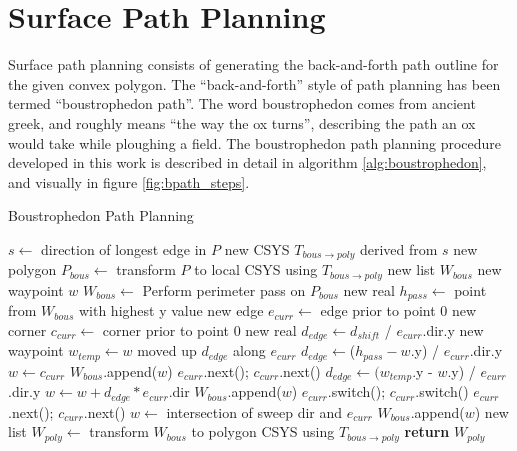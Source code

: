 \section{Surface Path Planning}
Surface path planning consists of generating the back-and-forth path outline for the given convex polygon.
The ``back-and-forth'' style of path planning has been termed ``boustrophedon path''.
The word boustrophedon comes from ancient greek, and roughly means ``the way the ox turns'', describing the path an ox would take while ploughing a field.
The boustrophedon path planning procedure developed in this work is described in detail in algorithm \ref{alg:boustrophedon}, and visually in figure \ref{fig:bpath_steps}.

\begin{algorithm}[htb]
\caption{Boustrophedon Path Planning}\label{alg:boustrophedon}
\begin{algorithmic}[1]
		\State $s \leftarrow$ direction of longest edge in $P$
	\EndIf
	\State new CSYS $T_{bous\rightarrow poly}$ derived from $s$
	\State new polygon $P_{bous} \leftarrow$ transform $P$ to local CSYS using $T_{bous\rightarrow poly}$
	\State new list $W_{bous}$ 
	\State new waypoint $w$
	\State $W_{bous} \leftarrow$ Perform perimeter pass on $P_{bous}$
	\State new real $h_{pass} \leftarrow$ point from $W_{bous}$ with highest y value
	\State new edge $e_{curr} \leftarrow$ edge prior to point 0
	\State new corner $c_{curr} \leftarrow$ corner prior to point 0
		\State new real $d_{edge} \leftarrow d_{shift}$ / $e_{curr}$.dir.y
		\State new waypoint $w_{temp} \leftarrow w$ moved up $d_{edge}$ along $e_{curr}$
			\State $d_{edge} \leftarrow $($h_{pass} - w$.y) / $e_{curr}$.dir.y
			\State $w \leftarrow c_{curr}$
			\State $W_{bous}$.append($w$)
			\State $e_{curr}$.next(); $c_{curr}$.next()
			\State $d_{edge} \leftarrow (w_{temp}$.y - $w$.y) / $e_{curr}$.dir.y
		\EndIf
		\State $w \leftarrow w + d_{edge} * e_{curr}$.dir
		\State $W_{bous}$.append($w$)
		\State $e_{curr}$.switch(); $c_{curr}$.switch()
			\State $e_{curr}$.next(); $c_{curr}$.next()
		\EndIf
		\State $w \leftarrow$ intersection of sweep dir and $e_{curr}$
		\State $W_{bous}$.append($w$)
	\EndWhile
	\State new list $W_{poly} \leftarrow$ transform $W_{bous}$ to polygon CSYS using $T_{bous\rightarrow poly}$
	\State \textbf{return} $W_{poly}$
\EndFunction
\end{algorithmic}
\end{algorithm}

